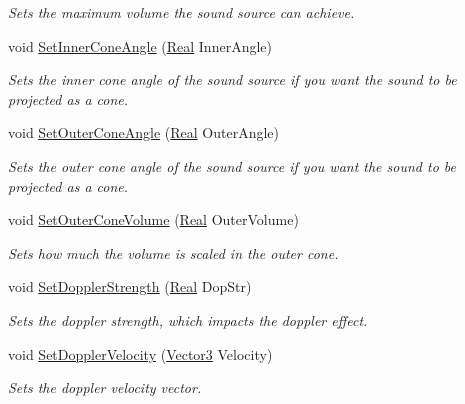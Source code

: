 \begin{DoxyCompactItemize}
\begin{DoxyCompactList}\small\item\em Sets the maximum volume the sound source can achieve. \item\end{DoxyCompactList}\item 
void \hyperlink{classphys_1_1Sound_ae231936d44db727eb48f9ff259ae0dd6}{SetInnerConeAngle} (\hyperlink{namespacephys_af7eb897198d265b8e868f45240230d5f}{Real} InnerAngle)
\begin{DoxyCompactList}\small\item\em Sets the inner cone angle of the sound source if you want the sound to be projected as a cone. \item\end{DoxyCompactList}\item 
void \hyperlink{classphys_1_1Sound_a4fc7d07d303ddb97acc15524950d0442}{SetOuterConeAngle} (\hyperlink{namespacephys_af7eb897198d265b8e868f45240230d5f}{Real} OuterAngle)
\begin{DoxyCompactList}\small\item\em Sets the outer cone angle of the sound source if you want the sound to be projected as a cone. \item\end{DoxyCompactList}\item 
void \hyperlink{classphys_1_1Sound_a55b0eadd492fc1a5fbae9848f5682ac9}{SetOuterConeVolume} (\hyperlink{namespacephys_af7eb897198d265b8e868f45240230d5f}{Real} OuterVolume)
\begin{DoxyCompactList}\small\item\em Sets how much the volume is scaled in the outer cone. \item\end{DoxyCompactList}\item 
void \hyperlink{classphys_1_1Sound_a159a5ac92577b55e86a8fc2dbf8bc806}{SetDopplerStrength} (\hyperlink{namespacephys_af7eb897198d265b8e868f45240230d5f}{Real} DopStr)
\begin{DoxyCompactList}\small\item\em Sets the doppler strength, which impacts the doppler effect. \item\end{DoxyCompactList}\item 
void \hyperlink{classphys_1_1Sound_a5a7f337dbc533f49269f736f51d25b85}{SetDopplerVelocity} (\hyperlink{classphys_1_1Vector3}{Vector3} Velocity)
\begin{DoxyCompactList}\small\item\em Sets the doppler velocity vector. \item\end{DoxyCompactList}\item 

\end{DoxyCompactItemize}
